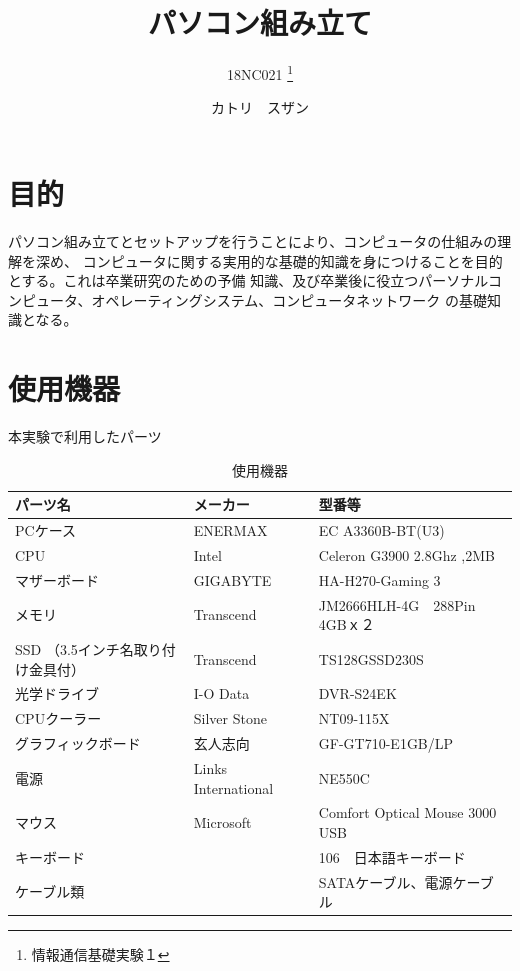 \documentclass[10pt]{article}
\title{パソコン組み立て}
\author{18NC021 \thanks{情報通信基礎実験１}}
\date{カトリ　スザン}
\begin{document}
\begin{titlepage}
	\maketitle
\end{titlepage}

\tableofcontents
\pagebreak

\section{目的}
パソコン組み立てとセットアップを行うことにより、コンピュータの仕組みの理解を深め、
コンピュータに関する実用的な基礎的知識を身につけることを目的とする。これは卒業研究のための予備
知識、及び卒業後に役立つパーソナルコンピュータ、オペレーティングシステム、コンピュータネットワーク
の基礎知識となる。


\section{使用機器}
本実験で利用したパーツ
\begingroup
\setlength{\tabcolsep}{5pt} %
\renewcommand{\arraystretch}{1.5} %
\begin{table}[H]
    \centering
	\caption{使用機器}
	\begin{tabular}{|l|l|l|}
		\hline
		パーツ名 & メーカー & 型番等 \\ [0.5ex] 
		\hline\hline
		PCケース                & ENERMAX             & EC A3360B-BT(U3)               \\ \hline
		CPU                  & Intel               & Celeron G3900 2.8Ghz ,2MB      \\ \hline
		マザーボード               & GIGABYTE            & HA-H270-Gaming 3               \\ \hline
		メモリ                  & Transcend           & JM2666HLH-4G　288Pin　4GBｘ２      \\ \hline
		SSD （3.5インチ名取り付け金具付） & Transcend           & TS128GSSD230S                  \\ \hline
		光学ドライブ               & I-O Data            & DVR-S24EK                      \\ \hline
		CPUクーラー              & Silver Stone        & NT09-115X                      \\ \hline
		グラフィックボード            & 玄人志向                & GF-GT710-E1GB/LP               \\ \hline
		電源                   & Links　International & NE550C                         \\ \hline
		マウス                  & Microsoft           & Comfort Optical Mouse 3000 USB \\ \hline
		キーボード                &                     & 106　日本語キーボード                   \\ \hline
		ケーブル類                &                     & SATAケーブル、電源ケーブル                \\ \hline
	\end{tabular}
\end{table} 
\endgroup
\pagebreak
\end{document}
